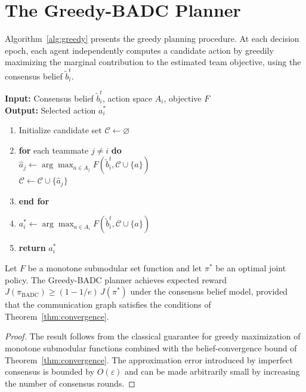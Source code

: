 \section{The Greedy-BADC Planner}

Algorithm~\ref{alg:greedy} presents the greedy planning procedure. At each
decision epoch, each agent independently computes a candidate action by
greedily maximizing the marginal contribution to the estimated team objective,
using the consensus belief $\tilde{b}_i^t$.

\begin{tcolorbox}[
  colback=jhulight,
  colframe=jhublue,
  arc=4pt,
  boxrule=0.8pt,
  left=16pt,
  right=16pt,
  top=10pt,
  bottom=10pt,
  title={\color{jhublue}\textbf{Algorithm 1: Greedy-BADC Planner}},
  fonttitle=\bfseries
]
\vspace{2pt}
\textbf{Input:} Consensus belief $\tilde{b}_i^t$, action space $A_i$,
  objective $F$\\
\textbf{Output:} Selected action $a_i^*$
\vspace{4pt}
\begin{enumerate}[leftmargin=*,itemsep=2pt,topsep=2pt]
  \item Initialize candidate set $\mathcal{C} \leftarrow \varnothing$
  \item \textbf{for} each teammate $j \neq i$ \textbf{do}\\[-2pt]
        \hspace*{12pt} $\hat{a}_j \leftarrow \arg\max_{a \in A_j} F(\tilde{b}_i^t, \mathcal{C} \cup \{a\})$\\[-2pt]
        \hspace*{12pt} $\mathcal{C} \leftarrow \mathcal{C} \cup \{\hat{a}_j\}$
  \item \textbf{end for}
  \item $a_i^* \leftarrow \arg\max_{a \in A_i} F(\tilde{b}_i^t, \mathcal{C} \cup \{a\})$
  \item \textbf{return} $a_i^*$
\end{enumerate}
\vspace{2pt}
\end{tcolorbox}
\vspace{8pt}

\begin{theorem}
  \label{thm:approx}
  Let $F$ be a monotone submodular set function and let $\pi^*$ be an optimal
  joint policy. The Greedy-BADC planner achieves expected reward
  $J(\pi_{\text{BADC}}) \geq (1 - 1/e) \, J(\pi^*)$ under the consensus belief
  model, provided that the communication graph satisfies the conditions of
  Theorem~\ref{thm:convergence}.
\end{theorem}

\begin{proof}
  The result follows from the classical guarantee for greedy maximization of
  monotone submodular functions \citep{nemhauser1978analysis} combined with
  the belief-convergence bound of Theorem~\ref{thm:convergence}. The
  approximation error introduced by imperfect consensus is bounded by
  $O(\varepsilon)$ and can be made arbitrarily small by increasing the
  number of consensus rounds.
\end{proof}
